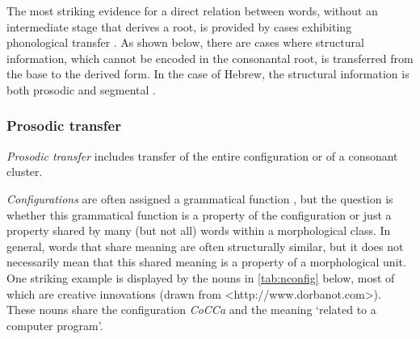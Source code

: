 \documentclass[output=paper,
modfonts
]{LSP/langsci}
\begin{document}
The most striking evidence for a direct relation between words, without
an intermediate stage that derives a root, is provided by cases
exhibiting phonological transfer \citep{clements1985a,hammond1988a,mccarthy1990a}. As shown below, there are cases where structural
information, which cannot be encoded in the consonantal root, is
transferred from the base to the derived form. In the case of Hebrew,
the structural information is both prosodic and segmental \citep{Batel1994}.

\subsubsection{Prosodic transfer}
\emph{Prosodic transfer} includes transfer of the entire configuration
or of a consonant cluster.

\emph{Configurations} are often assigned a grammatical function \citep{doron2003a}, but the question is whether this grammatical function is a
property of the configuration or just a property shared by many (but not
all) words within a morphological class. In general, words that share
meaning are often structurally similar, but it does not necessarily mean
that this shared meaning is a property of a morphological unit. One
striking example is displayed by the nouns in \cref{tab:nconfig} below, most of which
are creative innovations (drawn from
\textless{}http://www.dorbanot.com\textgreater{}). These nouns share the
configuration \emph{CoCCa} and the meaning `related to a computer
program'.

\end{document}
